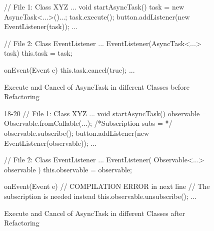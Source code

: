 \begin{figure}[h]
\begin{minipage}{0.48\textwidth}
\begin{sourcecode}
\begin{javacode}{19}
// File 1: Class XYZ
...
	void startAsyncTask() 
	{
		task = new AsyncTask<...>(){...};
		task.execute();
		button.addListener(new EventListener(task));
	}
...

// File 2: Class EventListener
...
	EventListener(AsyncTask<...> task) 
	{
		this.task = task;
	}

	onEvent(Event e){
		this.task.cancel(true);
	}
...
\end{javacode}
\caption{Execute and Cancel of AsyncTask in different Classes before Refactoring}
\label{code:rxfactor-cancel-before}
\end{sourcecode}
\end{minipage}\hspace{0.7cm}
\begin{minipage}{0.48\textwidth}
\begin{sourcecode}
\begin{javacode}{18-20}
// File 1: Class XYZ
...
	void startAsyncTask() 
	{
		observable = Observable.fromCallable(...);
		/*Subscription subs = */ observable.subscribe();
		button.addListener(new EventListener(observable));
	}
...

// File 2: Class EventListener
...
	EventListener( Observable<...>  observable ) {
			this.observable = observable;
	}

	onEvent(Event e){
		// COMPILATION ERROR in next line
		// The subscription is needed instead
		this.observable.unsubscribe();
	}
...
\end{javacode}
\caption{Execute and Cancel of AsyncTask in different Classes after Refactoring}
\label{code:rxfactor-cancel-after}
\end{sourcecode}
\end{minipage}
\end{figure}